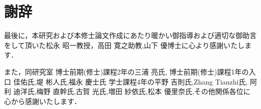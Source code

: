 \chapter*{謝辞}

最後に，本研究および本修士論文作成にあたり暖かい御指導および適切な御助言をして頂いた松永 昭一教授，高田 寛之助教,山下 優博士に心より感謝いたします．

また，同研究室
博士前期(修士)課程2年の三浦 亮氏,
博士前期(修士)課程1年の入口 佳佑氏,堤 彬人氏,福永 慶士氏
学士課程4年の平野 吉則氏,Zhang Tianzhi氏,
阿利 迪洋氏,梅野 直幹氏,古賀 光氏,増田 紗依氏,松本 優里奈氏,その他関係各位に心から感謝いたします．
